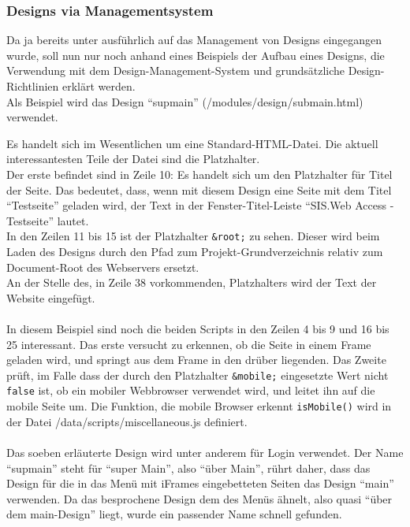 \subsubsection{Designs via Managementsystem}
Da ja bereits unter  ausführlich auf das Management von Designs eingegangen wurde, soll nun nur noch anhand eines Beispiels der Aufbau eines Designs, die Verwendung mit dem Design-Management-System und grundsätzliche Design-Richtlinien erklärt werden.\\
Als Beispiel wird das Design \enquote{supmain} (/modules/design/submain.html) verwendet.

Es handelt sich im Wesentlichen um eine Standard-HTML-Datei. Die aktuell interessantesten Teile der Datei sind die Platzhalter.\\
Der erste befindet sind in Zeile 10: Es handelt sich um den Platzhalter für Titel der Seite. Das bedeutet, dass, wenn mit diesem Design eine Seite mit dem Titel \enquote{Testseite} geladen wird, der Text in der Fenster-Titel-Leiste \enquote{SIS.Web Access - Testseite} lautet.\\
In den Zeilen 11 bis 15 ist der Platzhalter \texttt{\&root;} zu sehen. Dieser wird beim Laden des Designs durch den Pfad zum Projekt-Grundverzeichnis relativ zum Document-Root des Webservers ersetzt.\\
An der Stelle des, in Zeile 38 vorkommenden, Platzhalters wird der Text der Website eingefügt.\\
\\
In diesem Beispiel sind noch die beiden Scripts in den Zeilen 4 bis 9 und 16 bis 25 interessant. Das erste versucht zu erkennen, ob die Seite in einem Frame geladen wird, und springt aus dem Frame in den drüber liegenden. Das Zweite prüft, im Falle dass der durch den Platzhalter \texttt{\&mobile;} eingesetzte Wert nicht \texttt{false} ist, ob ein mobiler Webbrowser verwendet wird, und leitet ihn auf die mobile Seite um. Die Funktion, die mobile Browser erkennt \texttt{isMobile()} wird in der Datei /data/scripts/miscellaneous.js definiert.\\
\\
Das soeben erläuterte Design wird unter anderem für Login verwendet. Der Name \enquote{supmain} steht für \enquote{super Main}, also \enquote{über Main}, rührt daher, dass das Design für die in das Menü mit iFrames eingebetteten Seiten das Design \enquote{main} verwenden. Da das besprochene Design dem des Menüs ähnelt, also quasi \enquote{über dem main-Design} liegt, wurde ein passender Name schnell gefunden. 